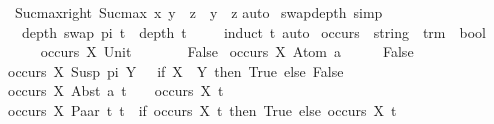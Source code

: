 \begin{isabellebody}
\ \ Suc{\isacharunderscore}{\kern0pt}max{\isacharunderscore}{\kern0pt}right{\isacharcolon}{\kern0pt}\ {\isachardoublequoteopen}Suc{\isacharparenleft}{\kern0pt}max\ x\ y{\isacharparenright}{\kern0pt}\ {\isacharequal}{\kern0pt}\ z\ {\isasymlongrightarrow}\ y\ {\isacharless}{\kern0pt}\ z{\isachardoublequoteclose}\isanewline
%
\isadelimproof
%
\endisadelimproof
%
\isatagproof
{}\isamarkupfalse%
{\isacharparenleft}{\kern0pt}auto{\isacharparenright}{\kern0pt}%
\endisatagproof
{\isafoldproof}%
%
\isadelimproof
\isanewline
%
\endisadelimproof
\isanewline
{}\isamarkupfalse%
\ swap{\isacharunderscore}{\kern0pt}depth\ {\isacharbrackleft}{\kern0pt}simp{\isacharbrackright}{\kern0pt}{\isacharcolon}{\kern0pt}\ \isanewline
\ \ \ {\isachardoublequoteopen}depth\ {\isacharparenleft}{\kern0pt}swap\ pi\ t{\isacharparenright}{\kern0pt}\ {\isacharequal}{\kern0pt}\ depth\ t{\isachardoublequoteclose}\ \isanewline
%
\isadelimproof
\ \ %
\endisadelimproof
%
\isatagproof
{}\isamarkupfalse%
\ {\isacharparenleft}{\kern0pt}induct\ t{\isacharparenright}{\kern0pt}\ {\isacharparenleft}{\kern0pt}auto{\isacharparenright}{\kern0pt}%
\endisatagproof
{\isafoldproof}%
%
\isadelimproof
\isanewline
%
\endisadelimproof
\isanewline
\isanewline
\isanewline
\isanewline
{}\isamarkupfalse%
\ occurs\ {\isacharcolon}{\kern0pt}{\isacharcolon}{\kern0pt}\ {\isachardoublequoteopen}string\ {\isasymRightarrow}\ trm\ {\isasymRightarrow}\ bool{\isachardoublequoteclose}\isanewline
\ \ \ \isanewline
\ \ {\isachardoublequoteopen}occurs\ X\ {\isacharparenleft}{\kern0pt}Unit{\isacharparenright}{\kern0pt}\ \ \ \ \ \ \ {\isacharequal}{\kern0pt}\ False{\isachardoublequoteclose}\isanewline
{\isacharbar}{\kern0pt}\ {\isachardoublequoteopen}occurs\ X\ {\isacharparenleft}{\kern0pt}Atom\ a{\isacharparenright}{\kern0pt}\ \ \ \ \ {\isacharequal}{\kern0pt}\ False{\isachardoublequoteclose}\isanewline
{\isacharbar}{\kern0pt}\ {\isachardoublequoteopen}occurs\ X\ {\isacharparenleft}{\kern0pt}Susp\ pi\ Y{\isacharparenright}{\kern0pt}\ \ {\isacharequal}{\kern0pt}\ {\isacharparenleft}{\kern0pt}if\ X\ {\isacharequal}{\kern0pt}\ Y\ then\ True\ else\ False{\isacharparenright}{\kern0pt}{\isachardoublequoteclose}\isanewline
{\isacharbar}{\kern0pt}\ {\isachardoublequoteopen}occurs\ X\ {\isacharparenleft}{\kern0pt}Abst\ a\ t{\isacharparenright}{\kern0pt}\ \ \ {\isacharequal}{\kern0pt}\ occurs\ X\ t{\isachardoublequoteclose}\isanewline
{\isacharbar}{\kern0pt}\ {\isachardoublequoteopen}occurs\ X\ {\isacharparenleft}{\kern0pt}Paar\ t{}\ t{}{\isacharparenright}{\kern0pt}\ {\isacharequal}{\kern0pt}\ {\isacharparenleft}{\kern0pt}if\ {\isacharparenleft}{\kern0pt}occurs\ X\ t{}{\isacharparenright}{\kern0pt}\ then\ True\ else\ {\isacharparenleft}{\kern0pt}occurs\ X\ t{}{\isacharparenright}{\kern0pt}{\isacharparenright}{\kern0pt}{\isachardoublequoteclose}\isanewline

\end{isabellebody}
